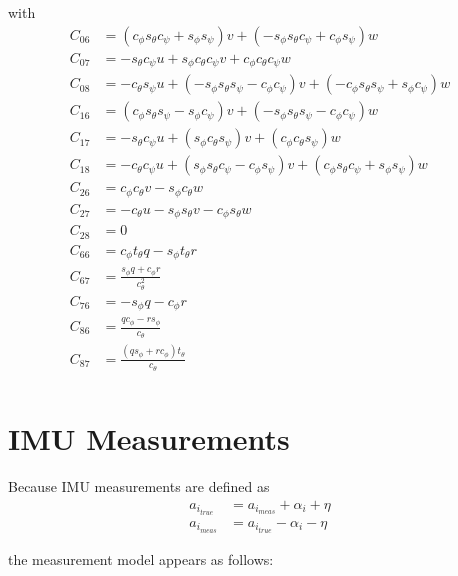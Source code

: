 \documentclass{article}
\newcommand{\cp}{c_{\phi}}
\newcommand{\ct}{c_{\theta}}
\newcommand{\cs}{c_{\psi}}
\newcommand{\sip}{s_{\phi}}
\newcommand{\sit}{s_{\theta}}
\newcommand{\sis}{s_{\psi}}
\newcommand{\tant}{t_{\theta}}
\begin{document}
with
\begin{equation}
	\begin{aligned}
		C_{06} &= (\cp\sit\cs+\sip\sis)v + (-\sip\sit\cs+\cp\sis)w \\
		C_{07} &= -\sit\cs u + \sip\ct\cs v + \cp\ct\cs w \\
		C_{08} &= -\ct\sis u + (-\sip\sit\sis-\cp\cs)v + (-\cp\sit\sis+\sip\cs)w \\
		C_{16} &= (\cp\sit\sis-\sip\cs)v + (-\sip \sit \sis-\cp\cs)w \\
		C_{17} &= -\sit\cs u + (\sip\ct\sis)v + (\cp\ct\sis)w \\
		C_{18} &= -\ct\cs u  + (\sip\sit\cs-\cp\sis)v + (\cp\sit\cs+\sip\sis)w \\
		C_{26} &= \cp\ct v   - \sip\ct w \\
		C_{27} &= -\ct u     - \sip\sit v - \cp\sit w \\
		C_{28} &= 0 \\
		C_{66} &= \cp \tant q-\sip \tant r\\
		C_{67} &= \tfrac{\sip q + \cp r}{c^{2}_{\theta}} \\
		C_{76} &= -\sip q-\cp r \\
		C_{86} &= \tfrac{q \cp-r \sip}{\ct} \\
		C_{87} &= \tfrac{(q \sip+r \cp) \tant}{\ct} \\
	\end{aligned}
\end{equation}

\section{IMU Measurements}

Because IMU measurements are defined as
\begin{equation}
\begin{aligned}
	a_{i_{true}} &= a_{i_{meas}} + \alpha_i + \eta \\
	a_{i_{meas}} &= a_{i_{true}} - \alpha_i - \eta
\end{aligned}
\end{equation}

the measurement model appears as follows:
\end{document}
